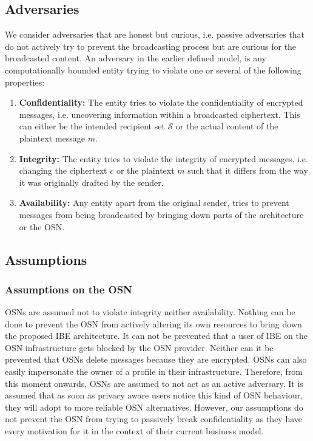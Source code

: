 \subsection{Adversaries}
We consider adversaries that are honest but curious, i.e. passive adversaries that do not actively try to prevent the broadcasting process but are curious for the broadcasted content. An adversary in the earlier defined model, is any computationally bounded entity trying to violate one or several of the following properties:
\begin{enumerate}
 \item \textbf{Confidentiality:} The entity tries to violate the confidentiality of encrypted messages, i.e. uncovering information within a broadcasted ciphertext. This can either be the intended recipient set $\mathcal{S}$ or the actual content of the plaintext message $m$.
 \item \textbf{Integrity:} The entity tries to violate the integrity of encrypted messages, i.e. changing the ciphertext $c$ or the plaintext $m$ such that it differs from the way it was originally drafted by the sender.
 \item \textbf{Availability:} Any entity apart from the original sender, tries to prevent messages from being broadcasted by bringing down parts of the architecture or the OSN. 
\end{enumerate}

\subsection{Assumptions}

\subsubsection{Assumptions on the OSN}
OSNs are assumed not to violate integrity neither availability. Nothing can be done to prevent the OSN from actively altering its own resources to bring down the proposed IBE architecture. It can not be prevented that a user of IBE on the OSN infrastructure gets blocked by the OSN provider. Neither can it be prevented that OSNs delete messages because they are encrypted. OSNs can also easily impersonate the owner of a profile in their infrastructure. Therefore, from this moment onwards, OSNs are assumed to not act as an active adversary. It is assumed that as soon as privacy aware users notice this kind of OSN behaviour, they will adopt to more reliable OSN alternatives. However, our assumptions do not prevent the OSN from trying to passively break confidentiality as they have every motivation for it in the context of their current business model.

